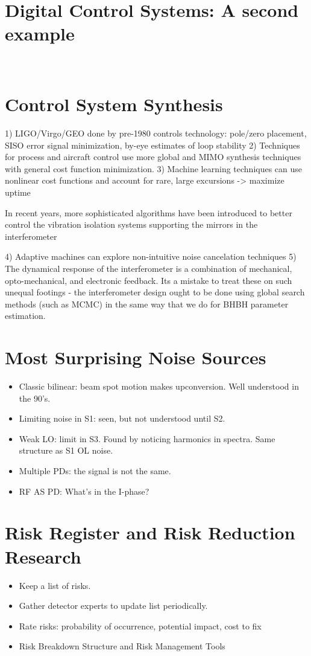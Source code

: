 \section{Digital Control Systems: A second example}

​\section{Control System Synthesis}
  1) LIGO/Virgo/GEO done by pre-1980 controls technology: pole/zero placement, SISO error signal minimization, by-eye estimates of loop stability
  2) Techniques for process and aircraft control use more global and MIMO synthesis techniques with general cost function minimization.
  3) Machine learning techniques can use nonlinear cost functions and account for rare, large excursions -> maximize uptime

In recent years, more sophisticated algorithms have been introduced to better control the vibration isolation
systems supporting the mirrors in the interferometer\cite{Beker:2014, Driggers:2012fl, Ryan:FFW2012}

  4) Adaptive machines can explore non-intuitive noise cancelation techniques​
  5) The dynamical response of the interferometer is a combination of mechanical, opto-mechanical, and electronic feedback. Its a mistake to treat these on such unequal footings - the interferometer design ought to be done using global search methods (such as MCMC) in the same way that we do for BHBH parameter estimation.

\section{Most Surprising Noise Sources}
\begin{itemize}
\item Classic bilinear: beam spot motion makes upconversion. Well understood in the 90's.
\item Limiting noise in S1: seen, but not understood until S2.
\item Weak LO: limit in S3. Found by noticing harmonics in spectra. Same structure as S1 OL noise.
\item Multiple PDs: the signal is not the same.
\item RF AS PD: What's in the I-phase?

\end{itemize}

\section{Risk Register and Risk Reduction Research}
\begin{itemize}
\item Keep a list of risks.
\item Gather detector experts to update list periodically.
\item Rate risks: probability of occurrence, potential impact, cost to fix
\item Risk Breakdown Structure and Risk Management Tools
\end{itemize}

